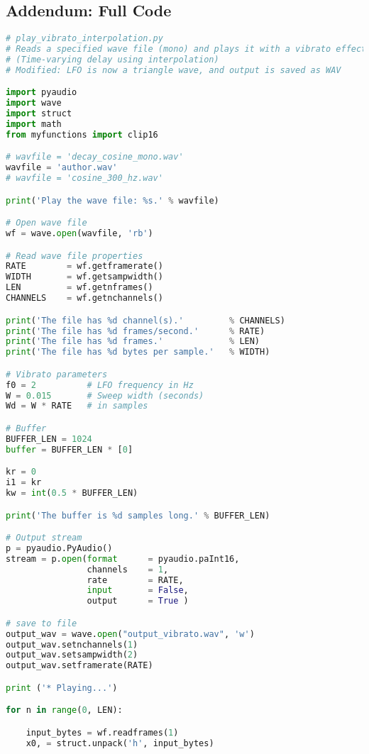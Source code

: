 \documentclass[11pt]{article}
\begin{document}
\subsection*{Addendum: Full Code}
    
\begin{lstlisting}[language=python, caption={Full code}]
# play_vibrato_interpolation.py
# Reads a specified wave file (mono) and plays it with a vibrato effect.
# (Time-varying delay using interpolation)
# Modified: LFO is now a triangle wave, and output is saved as WAV

import pyaudio
import wave
import struct
import math
from myfunctions import clip16

# wavfile = 'decay_cosine_mono.wav'
wavfile = 'author.wav'
# wavfile = 'cosine_300_hz.wav'

print('Play the wave file: %s.' % wavfile)

# Open wave file
wf = wave.open(wavfile, 'rb')

# Read wave file properties
RATE        = wf.getframerate()
WIDTH       = wf.getsampwidth()
LEN         = wf.getnframes()
CHANNELS    = wf.getnchannels()

print('The file has %d channel(s).'         % CHANNELS)
print('The file has %d frames/second.'      % RATE)
print('The file has %d frames.'             % LEN)
print('The file has %d bytes per sample.'   % WIDTH)

# Vibrato parameters
f0 = 2          # LFO frequency in Hz
W = 0.015       # Sweep width (seconds)
Wd = W * RATE   # in samples

# Buffer
BUFFER_LEN = 1024
buffer = BUFFER_LEN * [0]

kr = 0
i1 = kr
kw = int(0.5 * BUFFER_LEN)

print('The buffer is %d samples long.' % BUFFER_LEN)

# Output stream
p = pyaudio.PyAudio()
stream = p.open(format      = pyaudio.paInt16,
                channels    = 1,
                rate        = RATE,
                input       = False,
                output      = True )

# save to file
output_wav = wave.open("output_vibrato.wav", 'w')
output_wav.setnchannels(1)
output_wav.setsampwidth(2)
output_wav.setframerate(RATE)

print ('* Playing...')

for n in range(0, LEN):

    input_bytes = wf.readframes(1)
    x0, = struct.unpack('h', input_bytes)


\end{lstlisting}
\end{document}
